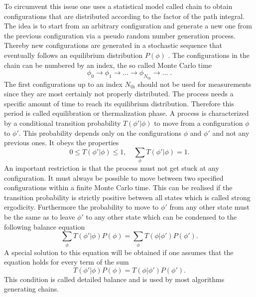 To circumvent this issue one uses a statistical model called  chain to obtain configurations that are distributed according to the  factor of the path integral. The idea is to start from an arbitrary configuration and generate a new one from the previous configuration via a pseudo random number generation process. Thereby new configurations are generated in a stochastic sequence that eventually follows an equilibrium distribution $P(\mathit{\phi})$ \cite{gattringer2009quantum}. The configurations in the chain can be numbered by an index, the so called Monte Carlo time
%
%
\begin{equation}
\mathit{\phi}_{0} \rightarrow \mathit{\phi}_{1} \rightarrow \ldots \rightarrow \mathit{\phi}_{N_{\text{th}}} \rightarrow \ldots \; .
\end{equation}
%
%
The first configurations up to an index $N_{\text{th}}$ should not be used for measurements since they are most certainly not properly distributed. The process needs a specific amount of time to reach its equilibrium distribution. Therefore this period is called equilibration or thermalization phase.
A  process is characterized by a conditional transition probability $T(\mathit{\phi}' \vert \mathit{\phi})$ to move from a configuration $\mathit{\phi}$ to $\mathit{\phi}'$. This probability depends only on the configurations $\mathit{\phi}$ and $\mathit{\phi}'$ and not any previous ones. It obeys the properties
%
%
\begin{equation}
0 \leq T(\mathit{\phi}' \vert \mathit{\phi}) \leq 1, \quad \sum\limits_{\mathit{\phi}} T(\mathit{\phi}' \vert \mathit{\phi}) =1.
\label{trans_prob}
\end{equation}
%
%
An important restriction is that the process must not get stuck at any configuration. It must always be possible to move between two specified configurations within a finite Monte Carlo time. This can be realised if the transition probability is strictly positive between all states which is called strong ergodicity. Furthermore the probability to move to $\mathit{\phi}'$ from any other state must be the same as to leave $\mathit{\phi}'$ to any other state which can be condensed to the following balance equation
%
%
\begin{equation}
\sum\limits_{\mathit{\phi}} T(\mathit{\phi}' \vert \mathit{\phi}) P(\mathit{\phi}) = \sum\limits_{\mathit{\phi}} T(\mathit{\phi} \vert \mathit{\phi}') P(\mathit{\phi}').
\end{equation}
%
%
A special solution to this equation will be obtained if one assumes that the equation holds for every term of the sum
%
%
\begin{equation}
T(\mathit{\phi}' \vert \mathit{\phi}) P(\mathit{\phi}) = T(\mathit{\phi} \vert \mathit{\phi}') P(\mathit{\phi}').
\end{equation}
%
%
This condition is called detailed balance and is used by most algorithms generating  chains.
%
%
%
%
%
